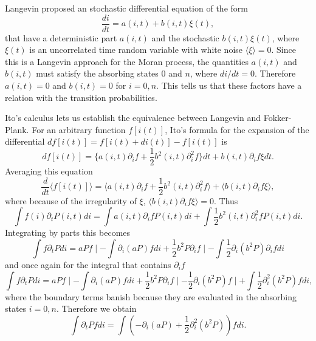 Langevin proposed an stochastic differential equation of the form
\begin{equation}\label{6.20}
\frac{di}{dt}=a(i,t) + b(i,t)\xi(t),
\end{equation}
that have a deterministic part $a(i,t)$ and the stochastic $b(i,t)\xi(t)$, where $\xi(t)$ is an uncorrelated time random variable with white noise $\langle\xi\rangle=0$. Since this is a Langevin approach for the Moran process, the quantities $a(i,t)$ and $b(i,t)$ must  satisfy the absorbing states $0$ and $n$, where $di/dt=0$. Therefore $a(i,t)=0$ and $b(i,t)=0$ for $i=0,n$. This tells us that these factors have a relation with the transition probabilities.

Ito's calculus lets us establish the equivalence between Langevin and Fokker-Plank\cite{Kampen, Gardiner}. For an  arbitrary function $f[i(t)]$,  Ito's formula for the expansion of the differential $df[i(t)]=f[i(t)+di(t)]-f[i(t)]$ is
\begin{equation}
df[i(t)]=\{a(i,t)\partial_{i}f+\frac{1}{2}b^2(i,t)\partial_{i}^{2}f\}dt+b(i,t)\partial_{i}f\xi dt.
\end{equation}  
Averaging this equation
\begin{equation}
\frac{d}{dt}\langle f[i(t)]\rangle=\langle a(i,t)\partial_{i}f+\frac{1}{2}b^2(i,t)\partial_{i}^{2}f\rangle + \langle b(i,t)\partial_{i}f\xi\rangle,
\end{equation}
where because of the irregularity of $\xi$, $\langle b(i,t)\partial_{i}f\xi\rangle=0$. Thus
\begin{equation}
\int f(i) \partial_{t}P(i,t) di=\int a(i,t)\partial_{i}f P(i,t) di +\int\frac{1}{2}b^2(i,t)\partial^{2}_{i}f P(i,t)di .
\end{equation}
 Integrating by parts this becomes
 \begin{equation}
 \int f \partial_{t}Pdi=aPf\mid-\int\partial_{i}(aP)fdi + \frac{1}{2}b^{2}P\partial_{i}f\mid -\int\frac{1}{2}\partial_{i}(b^2P)\partial_{i}f di 
 \end{equation} 
 and once again for the integral that contains $\partial_{i}f$
 \begin{equation}
  \int f \partial_{t}Pdi=aPf\mid-\int\partial_{i}(aP)fdi + \frac{1}{2}b^{2}P\partial_{i}f\mid - \frac{1}{2}\partial_{i}(b^2P)f\mid + \int\frac{1}{2}\partial^{2}_{i}(b^2P)fdi,
 \end{equation}  
  where the boundary terms banish because they  are evaluated in the absorbing states $i=0,n$. Therefore we obtain
  \begin{equation}
  \int \partial_{t}P f di=\int\left( -\partial_{i}(aP)+\frac{1}{2}\partial^{2}_{i}(b^2P)\right)fdi.
  \end{equation} 
